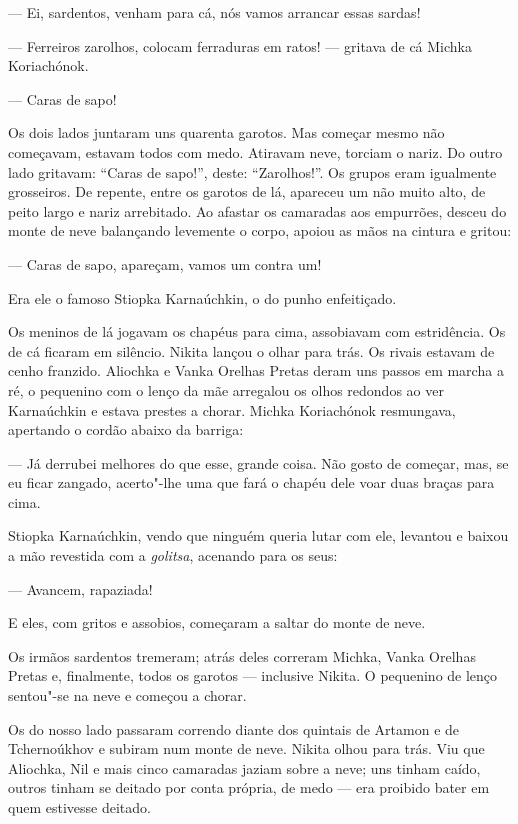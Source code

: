 --- Ei, sardentos, venham para cá, nós vamos arrancar essas sardas!

--- Ferreiros zarolhos, colocam ferraduras em ratos! --- gritava de cá
Michka Koriachónok.

--- Caras de sapo!

Os dois lados juntaram uns quarenta garotos. Mas começar mesmo não
começavam, estavam todos com medo. Atiravam neve, torciam o nariz. Do
outro lado gritavam: ``Caras de sapo!'', deste: ``Zarolhos!''. Os grupos
eram igualmente grosseiros. De repente, entre os garotos de lá, apareceu
um não muito alto, de peito largo e nariz arrebitado. Ao afastar os
camaradas aos empurrões, desceu do monte de neve balançando levemente o
corpo, apoiou as mãos na cintura e gritou:

--- Caras de sapo, apareçam, vamos um contra um!

Era ele o famoso Stiopka Karnaúchkin, o do punho enfeitiçado.

Os meninos de lá jogavam os chapéus para cima, assobiavam com
estridência. Os de cá ficaram em silêncio. Nikita lançou o olhar para
trás. Os rivais estavam de cenho franzido. Aliochka e Vanka Orelhas
Pretas deram uns passos em marcha a ré, o pequenino com o lenço da mãe
arregalou os olhos redondos ao ver Karnaúchkin e estava prestes a
chorar. Michka Koriachónok resmungava, apertando o cordão abaixo da
barriga:

--- Já derrubei melhores do que esse, grande coisa. Não gosto de
começar, mas, se eu ficar zangado, acerto"-lhe uma que fará o chapéu dele voar
duas braças para cima.

Stiopka Karnaúchkin, vendo que ninguém queria lutar com ele, levantou e
baixou a mão revestida com a \emph{golitsa}, acenando para os seus:

--- Avancem, rapaziada!

E eles, com gritos e assobios, começaram a saltar do monte de neve.

Os irmãos sardentos tremeram; atrás deles correram Michka, Vanka Orelhas
Pretas e, finalmente, todos os garotos --- inclusive Nikita. O pequenino
de lenço sentou"-se na neve e começou a chorar.

Os do nosso lado passaram correndo diante dos quintais de Artamon e de
Tchernoúkhov e subiram num monte de neve. Nikita olhou para
trás. Viu que Aliochka, Nil e mais cinco camaradas jaziam sobre a neve;
uns tinham caído, outros tinham se deitado por conta própria, de medo
--- era proibido bater em quem estivesse deitado.

